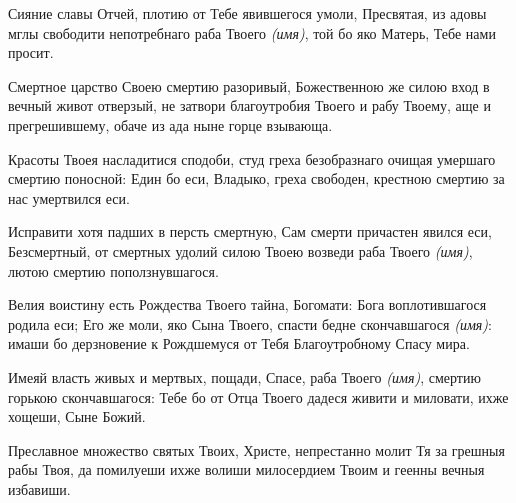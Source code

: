 \begin{mymulticols}
\inyne


Сияние славы Отчей, плотию от Тебе явившегося умоли, Пресвятая, из адовы мглы свободити непотребнаго раба Твоего {\itshape (имя)}, той бо яко Матерь, Тебе нами просит. 







Смертное царство Своею смертию разоривый, Божественною же силою вход в вечный живот отверзый, не затвори благоутробия Твоего и рабу Твоему, аще и прегрешившему, обаче из ада ныне горце взывающа.




Красоты Твоея насладитися сподоби, студ греха безобразнаго очищая умершаго смертию поносной: Един бо еси, Владыко, греха свободен, крестною смертию за нас умертвился еси.


\slava


Исправити хотя падших в персть смертную, Сам смерти причастен явился еси, Безсмертный, от смертных удолий силою Твоею возведи раба Твоего {\itshape (имя)}, лютою смертию поползнувшагося.


\inyne


Велия воистину есть Рождества Твоего тайна, Богомати: Бога воплотившагося родила еси; Его же моли, яко Сына Твоего, спасти бедне скончавшагося {\itshape (имя)}: имаши бо дерзновение к Рождшемуся от Тебя Благоутробному Спасу мира. 







Имеяй власть живых и мертвых, пощади, Спасе, раба Твоего {\itshape (имя)}, смертию горькою скончавшагося: Тебе бо от Отца Твоего дадеся живити и миловати, ихже хощеши, Сыне Божий.



Преславное множество святых Твоих, Христе, непрестанно молит Тя за грешныя рабы Твоя, да помилуеши ихже волиши милосердием Твоим и геенны вечныя избавиши.
\end{mymulticols}


